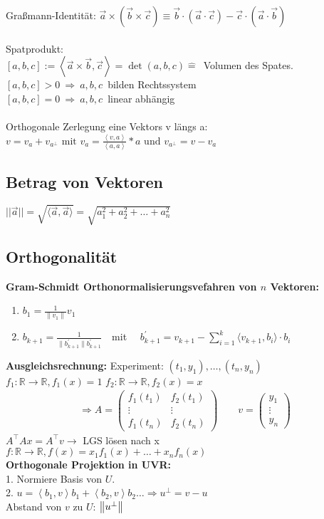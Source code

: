 \documentclass[6pt,a4paper]{scrartcl}
\newcommand{\norm}[2][\relax]{\ifx#1\relax \ensuremath{\left\Vert#2\right\Vert}\else \ensuremath{\left\Vert#2\right\Vert_{#1}}\fi}
\begin{document}
\begin{multicols}{3}
Graßmann-Identität: $\vec a\times(\vec b \times \vec c)\equiv\vec b\cdot(\vec a \cdot \vec c)-\vec c\cdot(\vec a \cdot \vec b)$\\
\\
Spatprodukt:\\
$[a,b,c]:=\left\langle \vec a\times\vec b,\vec c\right\rangle=\det (a,b,c)\mathrel{\widehat{=}}$\ Volumen des Spates.\\
$[a,b,c]>0\ \Rightarrow\ a,b,c$\ bilden Rechtssystem \\ $[a,b,c]=0\ \Rightarrow\ a,b,c$\ linear abhängig\\ \\
Orthogonale Zerlegung eine Vektors v längs a:\\
$v = v_a + v_{a^\perp} \text{ mit } v_a = \frac{\left\langle v, a\right\rangle }{\left\langle a, a\right\rangle }*a \text{ und }	 v_{a^\perp} = v - v_a	$

\subsection{Betrag von Vektoren}
$||\vec a||=\sqrt{\langle\vec a,\vec a\rangle} =\sqrt{a_1^2+a_2^2+\ldots +a_n^2}$

\subsection{Orthogonalität}
\textbf{Gram-Schmidt Orthonormalisierungsvefahren von $n$ Vektoren:}
\begin{enumerate}\itemsep0pt
	\item $b_1=\frac{1}{\|v_1\|}v_1$
	\item $b_{k+1}= \frac{1}{\|b_{k+1}^{'}\|b_{k+1}^{'}}$\ \ mit \ \ $b_{k+1}^{'}=v_{k+1}-\sum\limits_{i=1}^k \langle v_{k+1},b_i \rangle \cdot b_i$
\end{enumerate}
\textbf{Ausgleichsrechnung:} Experiment: $(t_1,y_1), \hdots, (t_n,y_n)$\\
$f_1: \mathbb R \rightarrow \mathbb R, f_1(x) =1$ \qquad $f_2: \mathbb R \rightarrow \mathbb R, f_2(x) = x$
\begin{eqnarray*}
	\Rightarrow A = \begin{pmatrix}f_1(t_1) & f_2(t_1)\\\vdots & \vdots\\f_1(t_n) & f_2(t_n)\end{pmatrix} \qquad v = \begin{pmatrix}y_1\\\vdots\\y_n\end{pmatrix}
\end{eqnarray*}
$A^{\top}Ax=A^{\top}v \rightarrow $ LGS lösen nach x\\
$f: \mathbb R \rightarrow \mathbb R, f(x) = x_1 f_1(x) + \hdots + x_n f_n(x)$
\\
\textbf{Orthogonale Projektion in UVR:} \quad \\
1. Normiere Basis von $U$. \\
2. $u = \left\langle b_1, v \right\rangle b_1 + \left\langle b_2, v \right\rangle b_2 \ldots \Rightarrow u^\perp = v - u$ \\
Abstand von $v$ zu $U$: $\norm{u^{\perp}}$


\end{multicols}
\end{document}
